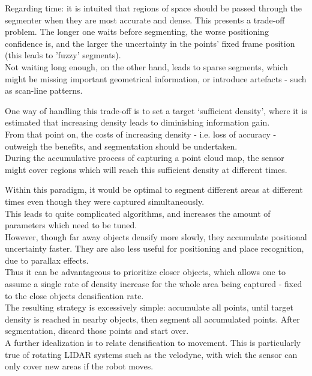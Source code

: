Regarding time: it is intuited that regions of space should be passed through the segmenter when they are most accurate and dense. This presents a trade-off problem. The longer one waits before segmenting, the worse positioning confidence is, and the larger the uncertainty in the points' fixed frame position (this leads to 'fuzzy' segments).\\

Not waiting long enough, on the other hand, leads to sparse segments, which might be missing important geometrical information, or introduce artefacts - such as scan-line patterns.

One way of handling this trade-off is to set a target `sufficient density', where it is estimated that increasing density leads to diminishing information gain.\\

From that point on, the costs of increasing density - i.e. loss of accuracy - outweigh the benefits, and segmentation should be undertaken.\\

During the accumulative process of capturing a point cloud map, the sensor might cover regions which will reach this sufficient density at different times.

Within this paradigm, it would be optimal to segment different areas at different times even though they were captured simultaneously.\\


This leads to quite complicated algorithms, and increases the amount of parameters which need to be tuned.\\

However, though far away objects densify more slowly, they accumulate positional uncertainty faster. They are also less useful for positioning and place recognition, due to parallax effects.\\

Thus it can be advantageous to prioritize closer objects, which allows one to assume a single rate of density increase for the whole area being captured - fixed to the close objects densification rate.\\

The resulting strategy is excessively simple: accumulate all points, until target density is reached in nearby objects, then segment all accumulated points. After segmentation, discard those points and start over.\\

A further idealization is to relate densification to movement. This is particularly true of rotating LIDAR systems such as the velodyne, with wich the sensor can only cover new areas if the robot moves.\\

